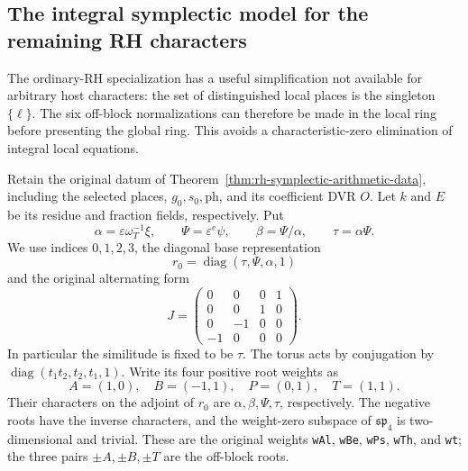 \subsection{The integral symplectic model for the remaining RH characters}
\label{sec:rh-symplectic-integral-model}

The ordinary-RH specialization has a useful simplification not available
for arbitrary host characters: the set of distinguished local places is
the singleton \(\{\ell\}\). The six off-block normalizations can therefore
be made in the local ring before presenting the global ring. This avoids
a characteristic-zero elimination of integral local equations.

Retain the original datum of
Theorem~\ref{thm:rh-symplectic-arithmetic-data}, including the selected
places, \(g_0,s_0,\mathrm{ph}\), and its coefficient DVR \(O\).
Let \(k\) and \(E\) be its residue and fraction fields, respectively.
Put
\[
 \alpha=\varepsilon\omega_T^{-1}\xi,\qquad
 \Psi=\varepsilon^e\psi,\qquad \beta=\Psi/\alpha,\qquad
 \tau=\alpha\Psi .
\]
We use indices \(0,1,2,3\), the diagonal base representation
\[
 r_0=\operatorname{diag}(\tau,\Psi,\alpha,1)
\]
and the original alternating form
\[
 J=\begin{pmatrix}
 0&0&0&1\\0&0&1&0\\0&-1&0&0\\-1&0&0&0
 \end{pmatrix}.
\]
In particular the similitude is fixed to be \(\tau\).
The torus acts by conjugation by
\(\operatorname{diag}(t_1t_2,t_2,t_1,1)\). Write its four positive
root weights as
\[
 A=(1,0),\quad B=(-1,1),\quad P=(0,1),\quad T=(1,1).
\]
Their characters on the adjoint of \(r_0\) are
\(\alpha,\beta,\Psi,\tau\), respectively. The negative roots have
the inverse characters, and the weight-zero subspace of
\(\mathfrak{sp}_4\) is two-dimensional and trivial.
These are the original weights \texttt{wAl}, \texttt{wBe},
\texttt{wPs}, \texttt{wTh}, and \texttt{wt}; the three pairs
\(\pm A,\pm B,\pm T\) are the off-block roots.


